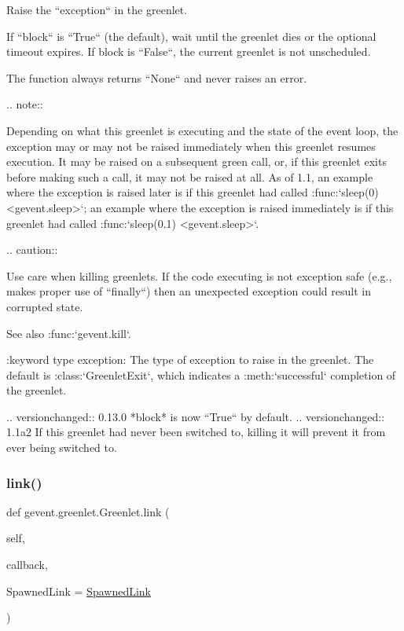 \begin{DoxyVerb}Raise the ``exception`` in the greenlet.

If ``block`` is ``True`` (the default), wait until the greenlet dies or the optional timeout expires.
If block is ``False``, the current greenlet is not unscheduled.

The function always returns ``None`` and never raises an error.

.. note::

    Depending on what this greenlet is executing and the state
    of the event loop, the exception may or may not be raised
    immediately when this greenlet resumes execution. It may
    be raised on a subsequent green call, or, if this greenlet
    exits before making such a call, it may not be raised at
    all. As of 1.1, an example where the exception is raised
    later is if this greenlet had called :func:`sleep(0)
    <gevent.sleep>`; an example where the exception is raised
    immediately is if this greenlet had called
    :func:`sleep(0.1) <gevent.sleep>`.

.. caution::

    Use care when killing greenlets. If the code executing is not
    exception safe (e.g., makes proper use of ``finally``) then an
    unexpected exception could result in corrupted state.

See also :func:`gevent.kill`.

:keyword type exception: The type of exception to raise in the greenlet. The default
    is :class:`GreenletExit`, which indicates a :meth:`successful` completion
    of the greenlet.

.. versionchanged:: 0.13.0
    *block* is now ``True`` by default.
.. versionchanged:: 1.1a2
    If this greenlet had never been switched to, killing it will prevent it from ever being switched to.
\end{DoxyVerb}
 \mbox{\label{classgevent_1_1greenlet_1_1_greenlet_a5b72cd674e92bcf08291428e62b53027}} 
\subsubsection{\texorpdfstring{link()}{link()}}
{\footnotesize\ttfamily def gevent.\+greenlet.\+Greenlet.\+link (\begin{DoxyParamCaption}\item[{}]{self,  }\item[{}]{callback,  }\item[{}]{Spawned\+Link = {\ttfamily \hyperlink{classgevent_1_1greenlet_1_1_spawned_link}{Spawned\+Link}} }\end{DoxyParamCaption})}

